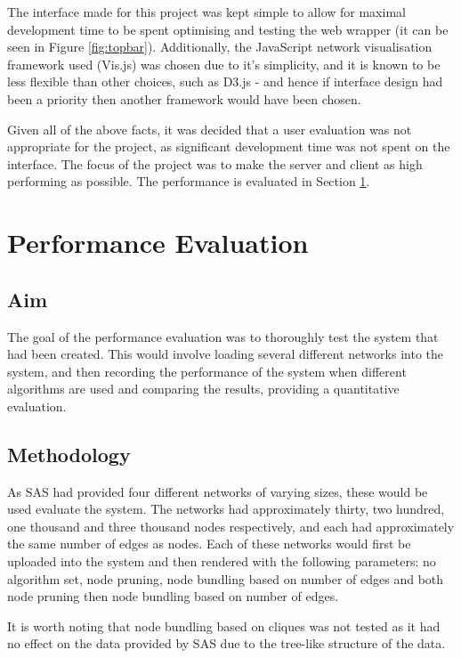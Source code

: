 \documentclass[../dissertation.tex]{subfiles}
\begin{document}
The interface made for this project was kept simple to allow for maximal development time to be spent optimising and testing the web wrapper (it can be seen in Figure \ref{fig:topbar}). Additionally, the JavaScript network visualisation framework used (Vis.js) was chosen due to it's simplicity, and it is known to be less flexible than other choices, such as D3.js - and hence if interface design had been a priority then another framework would have been chosen. 

Given all of the above facts, it was decided that a user evaluation was not appropriate for the project, as significant development time was not spent on the interface. The focus of the project was to make the server and client as high performing as possible. The performance is evaluated in Section \ref{sec:perf-eval}.

\section{Performance Evaluation}
\label{sec:perf-eval}

\subsection{Aim}

The goal of the performance evaluation was to thoroughly test the system that had been created. This would involve loading several different networks into the system, and then recording the performance of the system when different algorithms are used and comparing the results, providing a quantitative evaluation.

\subsection{Methodology}

As SAS had provided four different networks of varying sizes, these would be used evaluate the system. The networks had approximately thirty, two hundred, one thousand and three thousand nodes respectively, and each had approximately the same number of edges as nodes. Each of these networks would first be uploaded into the system and then rendered with the following parameters: no algorithm set, node pruning, node bundling based on number of edges and both node pruning then node bundling based on number of edges. 

It is worth noting that node bundling based on cliques was not tested as it had no effect on the data provided by SAS due to the tree-like structure of the data.
\end{document}
